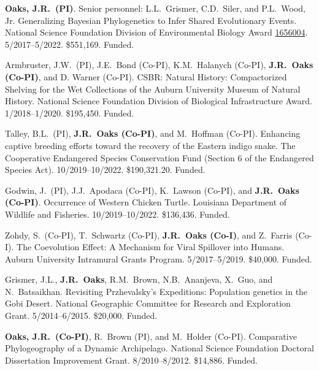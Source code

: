 \myHangIndent
\textbf{Oaks, J.R.\ (PI)}.
Senior personnel: L.L.\ Grismer, C.D.\ Siler, and P.L.\ Wood, Jr.
Generalizing Bayesian Phylogenetics to Infer Shared Evolutionary Events.
National Science Foundation Division of Environmental Biology Award
\href{https://www.nsf.gov/awardsearch/showAward?AWD_ID=1656004&HistoricalAwards=false}{1656004}.
5/2017--5/2022.
\$551,169.
Funded.

\myHangIndent
Armbruster, J.W.\ (PI),
J.E.\ Bond (Co-PI),
K.M.\ Halanych (Co-PI),
\textbf{J.R.\ Oaks (Co-PI)},
and
D. Warner (Co-PI).
CSBR: Natural History: Compactorized Shelving for the Wet Collections of the
Auburn University Museum of Natural History.
National Science Foundation Division of Biological Infrastructure Award.
1/2018--1/2020.
\$195,450.
Funded.


\myHangIndent
Talley, B.L.\ (PI),
\textbf{J.R.\ Oaks (Co-PI)},
and
M.\ Hoffman (Co-PI).
Enhancing captive breeding efforts toward the recovery of the Eastern indigo snake.
The Cooperative Endangered Species Conservation Fund (Section 6 of the
Endangered Species Act).
10/2019--10/2022.
\$190,321.20.
Funded.

\myHangIndent
Godwin, J.\ (PI),
J.J.\ Apodaca (Co-PI),
K.\ Lawson (Co-PI),
and
\textbf{J.R.\ Oaks (Co-PI)}.
Occurrence of Western Chicken Turtle.
Louisiana Department of Wildlife and Fisheries.
10/2019--10/2022.
\$136,436.
Funded.

\myHangIndent
Zohdy, S.\ (Co-PI), T.\ Schwartz (Co-PI), \textbf{J.R.\ Oaks (Co-I)}, and Z.\ Farris (Co-I).
The Coevolution Effect: A Mechanism for Viral Spillover into Humans.
Auburn University Intramural Grants Program.
5/2017--5/2019.
\$40,000.
Funded.

\myHangIndent
Grismer, J.L., \textbf{J.R.\ Oaks}, R.M.\ Brown, N.B.\ Ananjeva, X.\ Guo, and N.\
Batsaikhan.
Revisiting Przhevalsky's Expeditions: Population genetics in the Gobi Desert.
National Geographic Committee for Research and Exploration Grant.
5/2014--6/2015.
\$20,000.
Funded.

\myHangIndent
\textbf{Oaks, J.R.\ (Co-PI)}, R.\ Brown (PI), and M.\ Holder (Co-PI).
Comparative Phylogeography of a Dynamic Archipelago.
National Science Foundation Doctoral Dissertation Improvement Grant.
8/2010--8/2012.
\$14,886.
Funded.

